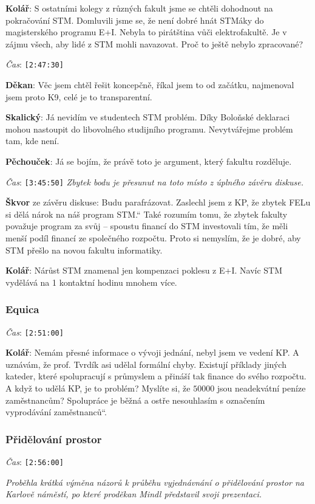 \documentclass[a4paper,10pt,notitlepage]{article}
\newcommand{\ts}[1]{\texttt{[#1]}}
\newcommand{\tsp}[1]{\noindent \textit{Čas}: \ts{#1}}
\newcommand{\cl}[1]{\noindent \textbf{#1}:}
\newcommand\uv[1]{\quotedblbase #1\textquotedblleft}%
\begin{document}
\cl{Kolář} S ostatními kolegy z různých fakult jsme se chtěli dohodnout na pokračování STM. Domluvili jsme se, že není dobré hnát STMáky do magisterského programu E+I. Nebyla to pirátština vůči elektrofakultě. Je v zájmu všech, aby lidé z STM mohli navazovat. Proč to ještě nebylo zpracované?

\tsp{2:47:30}

\cl{Děkan} Věc jsem chtěl řešit koncepčně, říkal jsem to od začátku, najmenoval jsem proto K9, celé je to transparentní.

\cl{Skalický} Já nevidím ve studentech STM problém. Díky Boloňské deklaraci mohou nastoupit do libovolného studijního programu. Nevytvářejme problém tam, kde není.

\cl{Pěchouček} Já se bojím, že právě toto je argument, který fakultu rozděluje.

\tsp{3:45:50} \textit{Zbytek bodu je přesunut na toto místo z úplného závěru diskuse.}

\textbf{Škvor} ze závěru diskuse: Budu parafrázovat. Zaslechl jsem z KP, že \uv{zbytek FELu si dělá nárok na náš program STM.} Také rozumím tomu, že zbytek fakulty považuje program za svůj -- spoustu financí do STM investovali tím, že měli menší podíl financí ze společného rozpočtu. Proto si nemyslím, že je dobré, aby STM přešlo na novou fakultu informatiky.

\cl{Kolář} Nárůst STM znamenal jen kompenzaci poklesu z E+I. Navíc STM vydělává na 1 kontaktní hodinu mnohem více.

\subsubsection{Equica}

\tsp{2:51:00}

\cl{Kolář} Nemám přesné informace o vývoji jednání, nebyl jsem ve vedení KP. A uznávám, že prof. Tvrdík asi udělal formální chyby. Existují příklady jiných kateder, které spolupracují s průmyslem a přináší tak finance do svého rozpočtu. A když to udělá KP, je to problém? Myslíte si, že $50 000$ jsou neadekvátní peníze zaměstnancům? Spolupráce je běžná a ostře nesouhlasím s označením \uv{vyprodávání zaměstnanců}.

\subsubsection{Přidělování prostor}

\tsp{2:56:00}

\noindent \textit{Proběhla krátká výměna názorů k průběhu vyjednávnání o přidělování prostor na Karlově náměstí, po které proděkan Mindl představil svoji prezentaci.}
\end{document}
